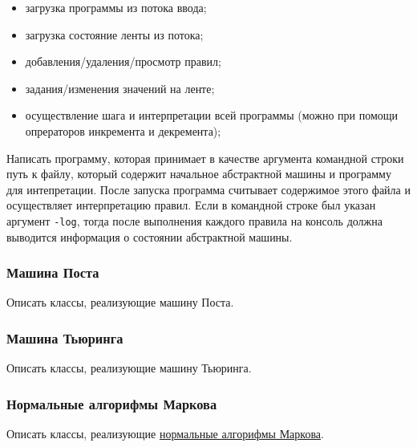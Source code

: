 \documentclass[a4paper,12pt]{article}
\begin{document}
\begin{itemize}
\item загрузка программы из потока ввода;
\item загрузка состояние ленты из потока;
\item добавления/удаления/просмотр правил;
\item задания/изменения значений на ленте;
\item осуществление шага и интерпретации всей программы (можно при
  помощи опрераторов инкремента и декремента);
\end{itemize}

Написать программу, которая принимает в качестве аргумента командной
строки путь к файлу, который содержит начальное абстрактной машины и
программу для интепретации. После запуска программа считывает
содержимое этого файла и осуществляет интерпретацию правил. Если в
командной строке был указан аргумент \verb|-log|, тогда после
выполнения каждого правила на консоль должна выводится информация о
состоянии абстрактной машины.

\subsubsection{Машина Поста}

Описать классы, реализующие машину Поста.

\subsubsection{Машина Тьюринга}

Описать классы, реализующие машину Тьюринга.

\subsubsection{Нормальные алгорифмы Маркова}

Описать классы, реализующие
\href{http://ru.wikipedia.org/wiki/%D0%9D%D0%BE%D1%80%D0%BC%D0%B0%D0%BB%D1%8C%D0%BD%D1%8B%D0%B9_%D0%B0%D0%BB%D0%B3%D0%BE%D1%80%D0%B8%D1%82%D0%BCe_%D0%9C%D0%B0%D1%80%D0%BA%D0%BE%D0%B2%D0%B0}{нормальные алгорифмы Маркова}.
\end{document}
